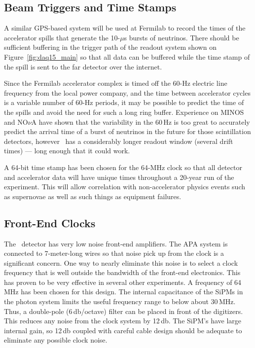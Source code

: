 \subsection{Beam Triggers and Time Stamps}

A similar GPS-based system will be used at Fermilab to record the times
of the accelerator spills that generate the 10-$\mu$s bursts of
neutrinos.  There should be  sufficient buffering in the trigger path
of the readout system shown on Figure~\ref{fig:daq15_main} so that all
data can be buffered while the time stamp of the spill is
sent to the far detector over the internet.  

Since the Fermilab accelerator complex is timed off the 60-Hz electric
line frequency from the local power company, and the time between
accelerator cycles is a variable number of 60-Hz periods, it may be
possible to predict the time of the spills and avoid the need for such
a long ring buffer.  Experience on MINOS and NO$\nu$A have shown that the
variability in the 60\,Hz is too great to accurately predict the
arrival time of a burst of neutrinos in the future for those scintillation detectors, 
however \LBNE\ has a
considerably longer readout window (several drift times) --- %
long enough that it
could work.%

A 64-bit time stamp has been chosen for the 64-MHz clock so that all
detector and accelerator data will have unique times throughout a 20-year
run of the experiment.  This will allow correlation with
non-accelerator physics events such as supernovae as well as such
things as equipment failures.

\subsection{Front-End Clocks}

The \LBNE\ detector has very low noise front-end amplifiers.  The APA
system is connected to 7-meter-long wires so that noise pick up from the
clock is a significant concern.  One way to nearly eliminate this noise is
to select a clock frequency that is well outside the bandwidth of the
front-end electronics.  This has proven to be very effective in
several other experiments.  A frequency of 64\,MHz has been chosen for this design.
The internal capacitance of the SiPMs in the photon system limits the
useful frequency range to 
below about 30\,MHz.  Thus, a double-pole (6\,db/octave) filter
can be placed in front of the digitizers. This reduces any noise from the clock
system by 12\,db.  The SiPM's have large internal gain, so 12\,db
coupled with careful cable design should be adequate to eliminate any
possible clock noise.

